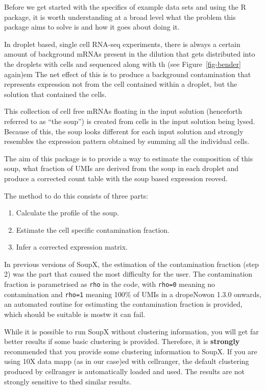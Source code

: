 \documentclass[
  letterpaper,
  DIV=11,
  numbers=noendperiod]{scrartcl}
\providecommand{\tightlist}{%
  \setlength{\itemsep}{0pt}\setlength{\parskip}{0pt}}\usepackage{longtable,booktabs,array}
\begin{document}
Before we get started with the specifics of example data sets and using
the R package, it is worth understanding at a broad level what the
problem this package aims to solve is and how it goes about doing it.

In droplet based, single cell RNA-seq experiments, there is always a
certain amount of background mRNAs present in the dilution that gets
distributed into the droplets with cells and sequenced along with th
(see Figure~\ref{fig-bender} again)em The net effect of this is to
produce a background contamination that represents expression not from
the cell contained within a droplet, but the solution that contained the
cells.

This collection of cell free mRNAs floating in the input solution
(henceforth referred to as ``the soup'') is created from cells in the
input solution being lysed. Because of this, the soup looks different
for each input solution and strongly resembles the expression pattern
obtained by summing all the individual cells.

The aim of this package is to provide a way to estimate the composition
of this soup, what fraction of UMIs are derived from the soup in each
droplet and produce a corrected count table with the soup based
expression reoved.

The method to do this consists of three parts:

\begin{enumerate}
\def\labelenumi{\arabic{enumi}.}
\tightlist
\item
  Calculate the profile of the soup.
\item
  Estimate the cell specific contamination fraction.
\item
  Infer a corrected expression matrix.
\end{enumerate}

In previous versions of SoupX, the estimation of the contamination
fraction (step 2) was the part that caused the most difficulty for the
user. The contamination fraction is parametrised as \texttt{rho} in the
code, with \texttt{rho=0} meaning no contamination and \texttt{rho=1}
meaning 100\% of UMIs in a dropeNowon 1.3.0 onwards, an automated
routine for estimating the contamination fraction is provided, which
should be suitable is mostw it can fail.

While it is possible to run SoupX without clustering information, you
will get far better results if some basic clustering is provided.
Therefore, it is \textbf{strongly} recommended that you provide some
clustering information to SoupX. If you are using 10X data mapp (as in
our case)ed with cellranger, the default clustering produced by
cellranger is automatically loaded and used. The results are not
strongly sensitive to thed similar results.
\end{document}

